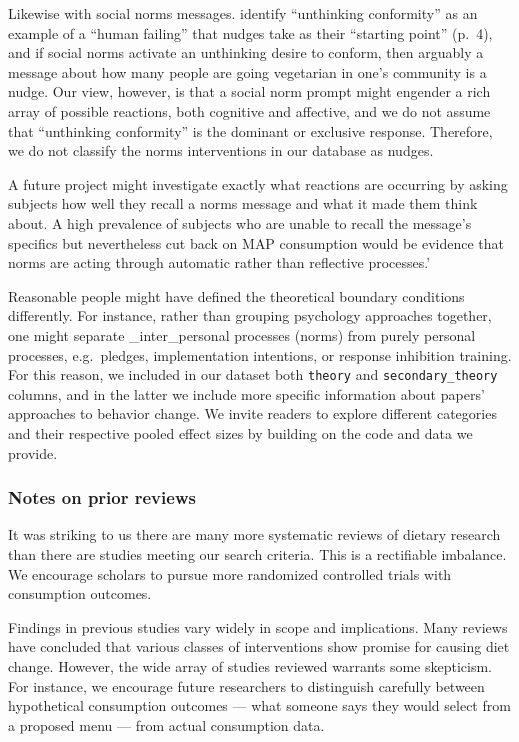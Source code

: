 \documentclass[sn-nature,pdflatex]{sn-jnl}
\begin{document}
Likewise with social norms messages. \citep{mols2015} identify
``unthinking conformity'' as an example of a ``human failing'' that
nudges take as their ``starting point'' (p.~4), and if social norms
activate an unthinking desire to conform, then arguably a message about
how many people are going vegetarian in one's community is a nudge. Our
view, however, is that a social norm prompt might engender a rich array
of possible reactions, both cognitive and affective, and we do not
assume that ``unthinking conformity'' is the dominant or exclusive
response. Therefore, we do not classify the norms interventions in our
database as nudges.

A future project might investigate exactly what reactions are occurring
by asking subjects how well they recall a norms message and what it made
them think about. A high prevalence of subjects who are unable to recall
the message's specifics but nevertheless cut back on MAP consumption
would be evidence that norms are acting through automatic rather than
reflective processes.'

Reasonable people might have defined the theoretical boundary conditions
differently. For instance, rather than grouping psychology approaches
together, one might separate \_inter\_personal processes (norms) from
purely personal processes, e.g.~pledges, implementation intentions, or
response inhibition training. For this reason, we included in our
dataset both \texttt{theory} and \texttt{secondary\_theory} columns, and
in the latter we include more specific information about papers'
approaches to behavior change. We invite readers to explore different
categories and their respective pooled effect sizes by building on the
code and data we provide.

\subsubsection{Notes on prior reviews}\label{notes-on-prior-reviews}

It was striking to us there are many more systematic reviews of dietary
research than there are studies meeting our search criteria. This is a
rectifiable imbalance. We encourage scholars to pursue more randomized
controlled trials with consumption outcomes.

Findings in previous studies vary widely in scope and implications. Many
reviews have concluded that various classes of interventions show
promise for causing diet change. However, the wide array of studies
reviewed warrants some skepticism. For instance, we encourage future
researchers to distinguish carefully between hypothetical consumption
outcomes --- what someone says they would select from a proposed menu
--- from actual consumption data.
\end{document}
